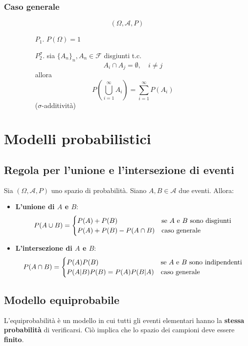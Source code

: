 \documentclass[a4paper]{article}
\theoremstyle{break}
\theoremstyle{break}
\theoremstyle{break}
\theoremstyle{break}
\begin{document}
\subsubsection{Caso generale}
\begin{figure}[H]
	\begin{definition}
		\[
			(\Omega, \mathcal{A}, P)
		\]
		\begin{enumerate}
			\item[$P_1.$] \( P(\Omega) = 1 \)
			\item[$P_2^\sigma.$] sia \( \{A_n\}_n, A_n \in \mathcal{F}  \) disgiunti t.c.
			      \[
				      A_i \cap A_j = \emptyset, \quad i \neq j
			      \]
			      allora
			      \[
				      P\left( \bigcup_{i=1}^{\infty} A_i \right) = \sum_{i=1}^{\infty} P(A_i)
			      \]
			      (\( \sigma  \)-additività)
		\end{enumerate}
	\end{definition}
\end{figure}

\section{Modelli probabilistici}
\subsection{Regola per l'unione e l'intersezione di eventi}
Sia \( (\Omega, \mathcal{A}, P) \) uno spazio di probabilità. Siano \( A,B \in \mathcal{A} \)
due eventi. Allora:
\begin{itemize}
  \item \textbf{L'unione di \( A \) e \( B \)}:
    \[
    P(A \cup B) = \begin{cases}
      P(A) + P(B) & \text{se \( A \) e \( B \) sono disgiunti} \\
      P(A) + P(B) - P(A \cap B) & \text{caso generale}
    \end{cases}
    \] 
  \item \textbf{L'intersezione di \( A \) e \( B \)}:
    \[
    P(A \cap B) = \begin{cases}
      P(A)P(B) & \text{se \( A \) e \( B \) sono indipendenti} \\
      P(A|B)P(B) = P(A)P(B|A) & \text{caso generale}
    \end{cases}
    \] 
\end{itemize}

\subsection{Modello equiprobabile}
L'equiprobabilità è un modello in cui tutti gli eventi elementari hanno la \textbf{stessa
	probabilità} di verificarsi. Ciò implica che lo spazio dei campioni deve essere \textbf{finito}.
\end{document}
